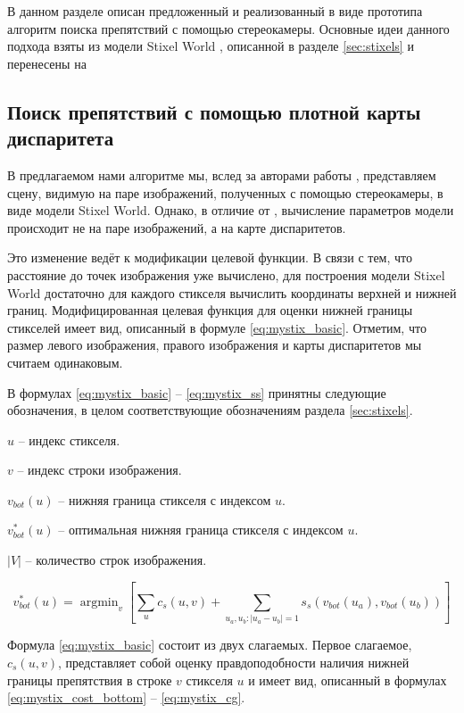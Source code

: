 \documentclass[aps,%
14pt,%
final,%
oneside,
onecolumn,%
musixtex, %
superscriptaddress,%
centertags]{extarticle} %
\DeclareMathOperator*{\argmin}{argmin}
\begin{document}
В данном разделе описан предложенный и реализованный в виде прототипа алгоритм поиска препятствий с помощью стереокамеры. Основные идеи данного подхода взяты из модели Stixel World \cite{pfeiffer2010efficient}, описанной в разделе \ref{sec:stixels} и перенесены на 

\subsection{Поиск препятствий с помощью плотной карты диспаритета}



В предлагаемом нами алгоритме мы, вслед за авторами работы \cite{pfeiffer2010efficient}, представляем сцену, видимую на паре изображений, полученных с помощью стереокамеры, в виде модели Stixel World. Однако, в отличие от \cite{pfeiffer2010efficient}, вычисление параметров модели происходит не на паре изображений, а на карте диспаритетов.

Это изменение ведёт к модификации целевой функции. В связи с тем, что расстояние до точек изображения уже вычислено, для построения модели Stixel World достаточно для каждого стикселя вычислить координаты верхней и нижней границ. Модифицированная целевая функция для оценки нижней границы стикселей имеет вид, описанный в формуле \ref{eq:mystix_basic}. Отметим, что размер левого изображения, правого изображения и карты диспаритетов мы считаем одинаковым.

В формулах \ref{eq:mystix_basic} -- \ref{eq:mystix_ss} принятны следующие обозначения, в целом соответствующие обозначениям раздела \ref{sec:stixels}.

$u$ -- индекс стикселя.

$v$ -- индекс строки изображения.

$v_{bot}(u)$ -- нижняя граница стикселя с индексом $u$.

$v_{bot}^*(u)$ -- оптимальная нижняя граница стикселя с индексом $u$.

$|V|$ -- количество строк изображения.

\begin{equation}\label{eq:mystix_basic}
v_{bot}^*(u) = \argmin_{v}[\sum_u c_s(u, v) + \sum_{u_a, u_b: |u_a - u_b| = 1} s_s(v_{bot}(u_a), v_{bot}(u_b))]
\end{equation}

Формула \ref{eq:mystix_basic} состоит из двух слагаемых. Первое слагаемое, $c_s(u, v)$, представляет собой оценку правдоподобности наличия нижней границы препятствия в строке $v$ стикселя $u$ и имеет вид, описанный в формулах \ref{eq:mystix_cost_bottom} -- \ref{eq:mystix_cg}. 
\end{document}
